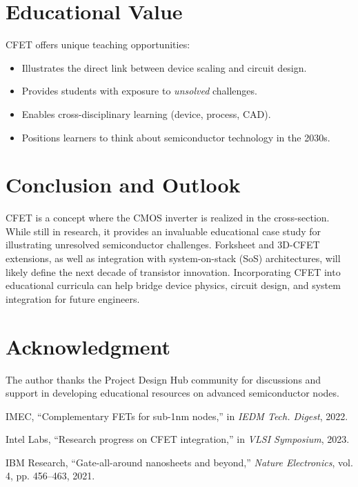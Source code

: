 \documentclass[conference]{IEEEtran}
\begin{document}
\section{Educational Value}
CFET offers unique teaching opportunities:
\begin{itemize}
\item Illustrates the direct link between device scaling and circuit
design.
\item Provides students with exposure to \textit{unsolved} challenges.
\item Enables cross-disciplinary learning (device, process, CAD).
\item Positions learners to think about semiconductor technology in the
2030s.
\end{itemize}

\section{Conclusion and Outlook}
CFET is a concept where the CMOS inverter is realized in the
cross-section. While still in research, it provides an invaluable
educational case study for illustrating unresolved semiconductor
challenges. Forksheet and 3D-CFET extensions, as well as integration
with system-on-stack (SoS) architectures, will likely define the next
decade of transistor innovation. Incorporating CFET into educational
curricula can help bridge device physics, circuit design, and system
integration for future engineers.

\section*{Acknowledgment}
The author thanks the Project Design Hub community for discussions and
support in developing educational resources on advanced semiconductor
nodes.

\begin{thebibliography}{1}
IMEC, ``Complementary FETs for sub-1nm nodes,'' in \textit{IEDM Tech.
Digest}, 2022.

Intel Labs, ``Research progress on CFET integration,'' in \textit{VLSI
Symposium}, 2023.

IBM Research, ``Gate-all-around nanosheets and beyond,'' \textit{Nature
Electronics}, vol. 4, pp. 456--463, 2021.

\end{thebibliography}
\end{document}
